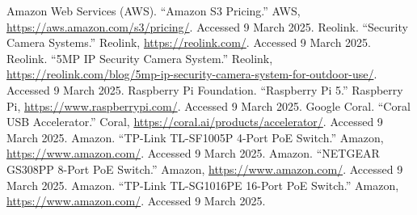 \documentclass{report}
\begin{document}
\begin{thebibliography}{9}
     Amazon Web Services (AWS). ``Amazon S3 Pricing.'' AWS, \url{https://aws.amazon.com/s3/pricing/}. Accessed 9 March 2025.
     Reolink. ``Security Camera Systems.'' Reolink, \url{https://reolink.com/}. Accessed 9 March 2025.
     Reolink. ``5MP IP Security Camera System.'' Reolink, \url{https://reolink.com/blog/5mp-ip-security-camera-system-for-outdoor-use/}. Accessed 9 March 2025.
     Raspberry Pi Foundation. ``Raspberry Pi 5.'' Raspberry Pi, \url{https://www.raspberrypi.com/}. Accessed 9 March 2025.
     Google Coral. ``Coral USB Accelerator.'' Coral, \url{https://coral.ai/products/accelerator/}. Accessed 9 March 2025.
     Amazon. ``TP-Link TL-SF1005P 4-Port PoE Switch.'' Amazon, \url{https://www.amazon.com/}. Accessed 9 March 2025.
     Amazon. ``NETGEAR GS308PP 8-Port PoE Switch.'' Amazon, \url{https://www.amazon.com/}. Accessed 9 March 2025.
     Amazon. ``TP-Link TL-SG1016PE 16-Port PoE Switch.'' Amazon, \url{https://www.amazon.com/}. Accessed 9 March 2025.
\end{thebibliography}
\end{document}
